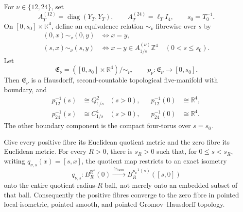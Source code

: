 \begin{theorem}
\label{cusp-cone-exact-decompactification-space}
For \(\nu\in\{12,24\}\), set
\[
 A_T^{(12)}=\operatorname{diag}(Y_T,Y_T),
 \qquad
 A_T^{(24)}=\ell_T I_4,
 \qquad s_0=T_0^{-1}.
\]
On \([0,s_0]\times\mathbb R^4\), define an equivalence relation
\(\sim_\nu\) fibrewise over \(s\) by
\begin{align*}
 (0,x)\sim_\nu(0,y)&\iff x=y,\\
 (s,x)\sim_\nu(s,y)&\iff
 x-y\in A_{1/s}^{(\nu)}\mathbb Z^4
 \quad(0<s\leq s_0).
\end{align*}
Let
\[
 \mathfrak E_\nu
 =([0,s_0]\times\mathbb R^4)/\!\sim_\nu,
 \qquad p_\nu:\mathfrak E_\nu\longrightarrow[0,s_0].
\]
Then \(\mathfrak E_\nu\) is a Hausdorff, second-countable topological
five-manifold with boundary, and
\begin{align}
 p_{12}^{-1}(s)&\cong Q_{1/s}^2 &(s>0),&
 &p_{12}^{-1}(0)&\cong\mathbb R^4,
 \label{cusp-cone-E12-fibres}\\
 p_{24}^{-1}(s)&\cong C_{1/s}^4 &(s>0),&
 &p_{24}^{-1}(0)&\cong\mathbb R^4.
 \label{cusp-cone-E24-fibres}
\end{align}
The other boundary component is the compact four-torus over \(s=s_0\).

Give every positive fibre its Euclidean quotient metric and the zero fibre
its Euclidean metric.  For every \(R>0\), there is \(s_R>0\) such that,
for \(0\leq s<s_R\), writing
\(q_{\nu,s}(x)=[s,x]\), the quotient map restricts to an exact isometry
\[
 q_{\nu,s}:B_R^{\mathbb R^4}(0)
 \xrightarrow{\ \cong_{\mathrm{isom}}\ }
 B_R^{p_\nu^{-1}(s)}([s,0])
\]
onto the entire quotient radius-\(R\) ball, not merely onto an embedded
subset of that ball.
Consequently the positive fibres converge to the zero fibre in pointed
local-isometric, pointed smooth, and pointed Gromov--Hausdorff topology.


\end{theorem}
